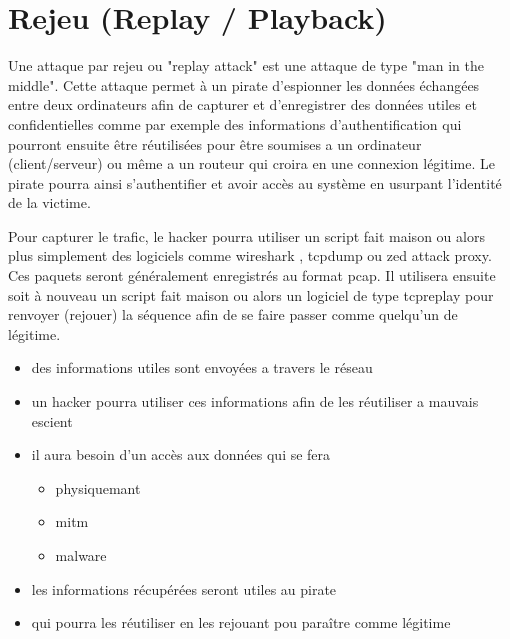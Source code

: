 

\newpage
\section{Rejeu (Replay / Playback)}\label{vulnerabilites:reseau:replay}

Une attaque par rejeu ou "replay attack" est une attaque de type "man in the middle". Cette attaque permet à un pirate d'espionner les données échangées entre deux ordinateurs afin de capturer et d'enregistrer des données utiles et confidentielles comme par exemple des informations d'authentification qui pourront ensuite être réutilisées pour être soumises a un ordinateur (client/serveur) ou même a un routeur qui croira en une connexion légitime. Le pirate pourra ainsi s'authentifier et avoir accès au système en usurpant l'identité de la victime.
\begin{flushleft}
Pour capturer le trafic, le hacker pourra utiliser un script fait maison ou alors plus simplement des logiciels comme wireshark , tcpdump ou zed attack proxy. Ces paquets seront généralement enregistrés au format pcap. Il utilisera ensuite soit à nouveau un script fait maison ou alors un logiciel de type tcpreplay pour renvoyer (rejouer) la séquence afin de se faire passer comme quelqu'un de légitime.
\end{flushleft}

\bigskip

\begin{itemize}
\item des informations utiles sont envoyées a travers le réseau
\item un hacker pourra utiliser ces informations afin de les réutiliser a mauvais escient
\item il aura besoin d'un accès aux données qui se fera
\begin{itemize}
\item physiquemant
\item mitm 
\item malware
\end{itemize}
\item les informations récupérées seront utiles au pirate
\item qui pourra les réutiliser en les rejouant pou paraître comme légitime
\end{itemize}

